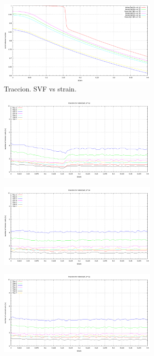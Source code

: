 \documentclass[10pt, oneside]{article} %
\begin{document}
\begin{figure}[H]
\centering
\includegraphics[width=8cm]{Figures/Porosidad/Porosidad_svf_strain_2vel_trac.png}
\caption{Traccion. SVF vs strain.}
\label{fg:3trac}
\end{figure}

\begin{figure}[H]
\centering
\includegraphics[width=8cm]{Figures/Porosidad/Porosidad_2vel_trac_voronoi1.png}
\caption{}
\label{fg:4trac}
\end{figure}

\begin{figure}[H]
\centering
\includegraphics[width=8cm]{Figures/Porosidad/Porosidad_2vel_trac_voronoi2.png}
\caption{}
\end{figure}

\begin{figure}[H]
\centering
\includegraphics[width=8cm]{Figures/Porosidad/Porosidad_2vel_trac_voronoi3.png}
\caption{}
\end{figure}
\end{document}
